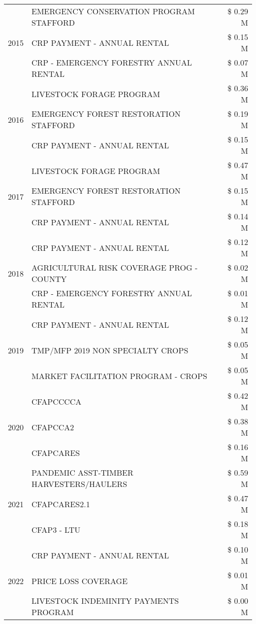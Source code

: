 \begin{tabular}{llr}
\cline{1-3}
\multirow[t]{3}{*}{2015} & EMERGENCY CONSERVATION PROGRAM STAFFORD & \$ 0.29 M \\
 & CRP PAYMENT - ANNUAL RENTAL & \$ 0.15 M \\
 & CRP - EMERGENCY FORESTRY ANNUAL RENTAL & \$ 0.07 M \\
\cline{1-3}
\multirow[t]{3}{*}{2016} & LIVESTOCK FORAGE PROGRAM & \$ 0.36 M \\
 & EMERGENCY FOREST RESTORATION STAFFORD & \$ 0.19 M \\
 & CRP PAYMENT - ANNUAL RENTAL & \$ 0.15 M \\
\cline{1-3}
\multirow[t]{3}{*}{2017} & LIVESTOCK FORAGE PROGRAM & \$ 0.47 M \\
 & EMERGENCY FOREST RESTORATION STAFFORD & \$ 0.15 M \\
 & CRP PAYMENT - ANNUAL RENTAL & \$ 0.14 M \\
\cline{1-3}
\multirow[t]{3}{*}{2018} & CRP PAYMENT - ANNUAL RENTAL & \$ 0.12 M \\
 & AGRICULTURAL RISK COVERAGE PROG - COUNTY & \$ 0.02 M \\
 & CRP - EMERGENCY FORESTRY ANNUAL RENTAL & \$ 0.01 M \\
\cline{1-3}
\multirow[t]{3}{*}{2019} & CRP PAYMENT - ANNUAL RENTAL & \$ 0.12 M \\
 & TMP/MFP 2019 NON SPECIALTY CROPS & \$ 0.05 M \\
 & MARKET FACILITATION PROGRAM - CROPS & \$ 0.05 M \\
\cline{1-3}
\multirow[t]{3}{*}{2020} & CFAPCCCCA & \$ 0.42 M \\
 & CFAPCCA2 & \$ 0.38 M \\
 & CFAPCARES & \$ 0.16 M \\
\cline{1-3}
\multirow[t]{3}{*}{2021} & PANDEMIC ASST-TIMBER HARVESTERS/HAULERS & \$ 0.59 M \\
 & CFAPCARES2.1 & \$ 0.47 M \\
 & CFAP3 - LTU & \$ 0.18 M \\
\cline{1-3}
\multirow[t]{3}{*}{2022} & CRP PAYMENT - ANNUAL RENTAL & \$ 0.10 M \\
 & PRICE LOSS COVERAGE & \$ 0.01 M \\
 & LIVESTOCK INDEMINITY PAYMENTS PROGRAM & \$ 0.00 M \\
\cline{1-3}
\bottomrule
\end{tabular}
